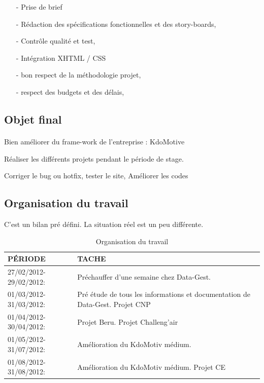 \begin{itemize}
  \item [-]Prise de brief 
  \item [-]Rédaction des spécifications fonctionnelles et des story-boards, 
  \item [-]Contrôle qualité et test, 
  \item [-]Intégration XHTML / CSS
  \item [-]bon respect de la méthodologie projet,
  \item [-]respect des budgets et des délais, 
\end{itemize}

\subsection{Objet final}
\paragraph{}
Bien améliorer du frame-work de l'entreprise : KdoMotive

Réaliser les différents projets pendant le période de stage. 

Corriger le bug ou hotfix, tester le site, 
Améliorer les codes

\subsection{Organisation du travail}

C'est un bilan pré défini. La situation réel est un peu différente.  
\begin{table}[htbp]
\renewcommand{\tabularxcolumn}[1]{>{\arraybackslash}m{#1}}
\begin{tabularx}{\textwidth}{lX}
\toprule
PÉRIODE & TACHE \\
\midrule
27/02/2012-29/02/2012: &  Préchauffer d'une semaine chez Data-Gest. \\ 
\hline 
01/03/2012-31/03/2012: & Pré étude de tous les informations et documentation de Data-Gest. Projet CNP \\ 
\hline 
01/04/2012-30/04/2012: & Projet Beru. Projet Challeng'air \\ 
\hline 
01/05/2012-31/07/2012: & Amélioration du KdoMotiv médium.  \\ 
\hline 
01/08/2012-31/08/2012: & Amélioration du KdoMotiv médium. Projet CE \\ 
\bottomrule
\end{tabularx} 
 \caption{Organisation du travail}
\end{table}





